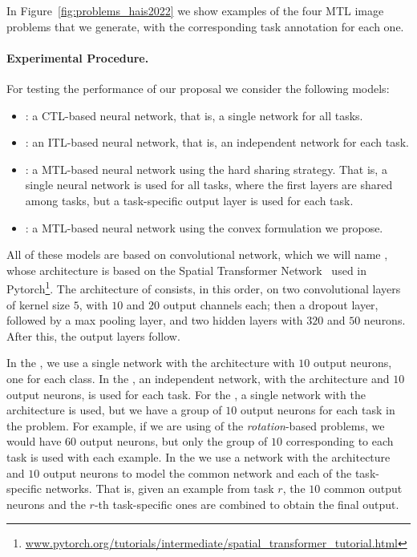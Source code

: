 In Figure~\ref{fig:problems_hais2022} we show examples of the four MTL image problems that we generate, with the corresponding task annotation for each one.



\paragraph*{Experimental Procedure.\\}
For testing the performance of our proposal we consider the following models:
\begin{itemize}
    \item {}: a CTL-based neural network, that is, a single network for all tasks.
    \item {}: an ITL-based neural network, that is, an independent network for each task.
    \item {}: a MTL-based neural network using the hard sharing strategy. That is, a single neural network is used for all tasks, where the first layers are shared among tasks, but a task-specific output layer is used for each task.
    \item {}: a MTL-based neural network using the convex formulation we propose.
\end{itemize}
All of these models are based on convolutional network, which we will name , whose architecture is based on the Spatial Transformer Network~\citep{Jaderberg_2015} used in Pytorch\footnote{\href{www.pytorch.org/tutorials/intermediate/spatial\_transformer\_tutorial.html}{www.pytorch.org/tutorials/intermediate/spatial\_transformer\_tutorial.html}}.
The architecture of  consists, in this order, on two convolutional layers of kernel size $5$, with $10$ and $20$ output channels each; then a dropout layer, followed by a max pooling layer, and two hidden layers with $320$ and $50$ neurons. After this, the output layers follow.

%
In the , we use a single network with the  architecture with $10$ output neurons, one for each class.
%
In the , an independent network, with the  architecture and $10$ output neurons, is used for each task.
%
For the , a single network with the  architecture is used, but we have a group of $10$ output neurons for each task in the problem. For example, if we are using of the \emph{rotation}-based problems, we would have $60$ output neurons, but only the group of $10$ corresponding to each task is used with each example.
%
In the  we use a network with the  architecture and $10$ output neurons to model the common network and each of the task-specific networks. That is, given an example from task $r$, the $10$ common output neurons and the  $r$-th task-specific ones are combined to obtain the final output. 


